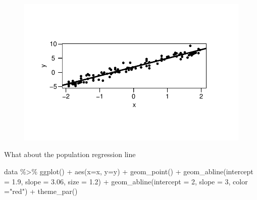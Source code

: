 \documentclass[
  letterpaper,
  DIV=11,
  numbers=noendperiod]{scrreprt}
\newenvironment{Shaded}{\begin{snugshade}}{\end{snugshade}}
\newcommand{\AttributeTok}[1]{\textcolor[rgb]{0.40,0.45,0.13}{#1}}
\newcommand{\DecValTok}[1]{\textcolor[rgb]{0.68,0.00,0.00}{#1}}
\newcommand{\FloatTok}[1]{\textcolor[rgb]{0.68,0.00,0.00}{#1}}
\newcommand{\FunctionTok}[1]{\textcolor[rgb]{0.28,0.35,0.67}{#1}}
\newcommand{\NormalTok}[1]{\textcolor[rgb]{0.00,0.23,0.31}{#1}}
\newcommand{\SpecialCharTok}[1]{\textcolor[rgb]{0.37,0.37,0.37}{#1}}
\newcommand{\StringTok}[1]{\textcolor[rgb]{0.13,0.47,0.30}{#1}}
\begin{document}
\begin{figure}[H]

{\centering \includegraphics{Chapter3_files/figure-pdf/unnamed-chunk-15-1.pdf}

}

\end{figure}

What about the population regression line

\begin{Shaded}
\begin{Highlighting}[]
\NormalTok{data }\SpecialCharTok{\%\textgreater{}\%} 
  \FunctionTok{ggplot}\NormalTok{() }\SpecialCharTok{+} \FunctionTok{aes}\NormalTok{(}\AttributeTok{x=}\NormalTok{x, }\AttributeTok{y=}\NormalTok{y) }\SpecialCharTok{+} \FunctionTok{geom\_point}\NormalTok{() }\SpecialCharTok{+} \FunctionTok{geom\_abline}\NormalTok{(}\AttributeTok{intercept =} \FloatTok{1.9}\NormalTok{, }\AttributeTok{slope =} \FloatTok{3.06}\NormalTok{, }\AttributeTok{size =} \FloatTok{1.2}\NormalTok{) }\SpecialCharTok{+} \FunctionTok{geom\_abline}\NormalTok{(}\AttributeTok{intercept =} \DecValTok{2}\NormalTok{, }\AttributeTok{slope =} \DecValTok{3}\NormalTok{, }\AttributeTok{color =}\StringTok{"red"}\NormalTok{) }\SpecialCharTok{+} \FunctionTok{theme\_par}\NormalTok{()}
\end{Highlighting}
\end{Shaded}
\end{document}
